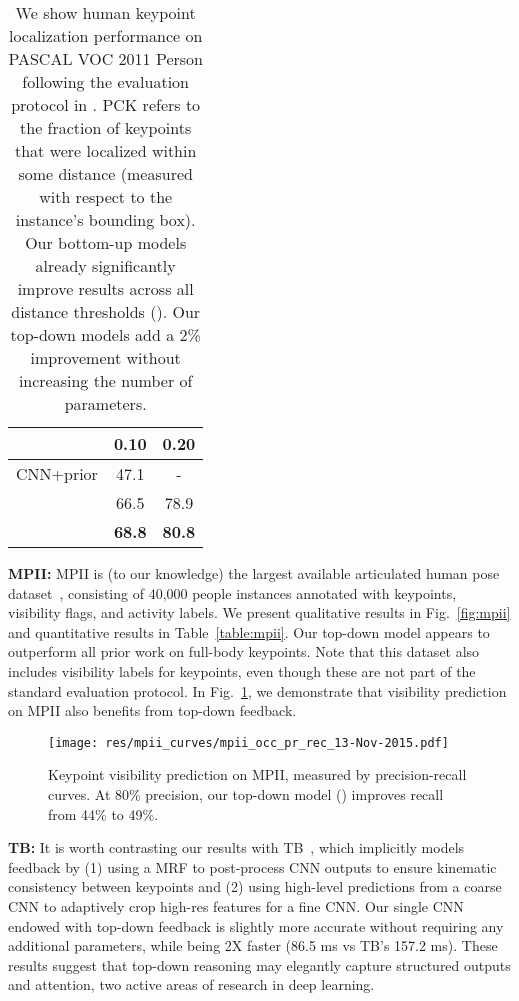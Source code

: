 \documentclass[10pt,twocolumn,letterpaper]{article}
\newcommand{\QP}[1]{{}}
\begin{document}
\begin{table}
  \centering
    \begin{tabular}{l|c|c}
                               & 0.10       & 0.20       \\
      \hline \hline
      CNN+prior\cite{long2014convnets} & 47.1       & -          \\
      \hline
      \QP{1}                           & 66.5       & 78.9       \\
      \QP{2}                           & {\bf 68.8} & {\bf 80.8} \\
    \end{tabular}
\caption{We show human keypoint localization performance on PASCAL
      VOC 2011 Person following the evaluation protocol in
      \cite{long2014convnets}. PCK refers to the fraction of keypoints
      that were localized within some distance (measured with respect
      to the instance's bounding box). Our bottom-up models already
      significantly improve results across all distance thresholds
      (). Our top-down models add a 2\% improvement
      without increasing the number of parameters. }
    \label{table:pascal}
\end{table}

{\bf MPII:} MPII is (to our knowledge) the largest available
articulated human pose dataset~\cite{andriluka14cvpr}, consisting of
40,000 people instances annotated with keypoints, visibility flags,
and activity labels. We present qualitative results in
Fig.~\ref{fig:mpii} and quantitative results in
Table~\ref{table:mpii}. Our top-down model \QP{2} appears to
outperform all prior work on full-body keypoints. Note that this dataset also includes visibility labels for keypoints, even though these are not
part of the standard evaluation protocol. In Fig.~\ref{fig:mpii-occ},
we demonstrate that visibility prediction on MPII also benefits from
top-down feedback.
\begin{figure}[t!]
  \centering
  \texttt{[image: res/mpii\_curves/mpii\_occ\_pr\_rec\_13-Nov-2015.pdf]}
  \caption{Keypoint visibility prediction on MPII, measured by
    precision-recall curves. At 80\% precision, our top-down model () improves recall from 44\% to 49\%.}
  \label{fig:mpii-occ}
\end{figure}



{\bf TB: } It is worth contrasting our results with TB~\cite{tompson2015efficient}, which implicitly models feedback by (1) using a MRF to post-process CNN outputs to ensure
kinematic consistency between keypoints and (2) using high-level
predictions from a coarse CNN to adaptively crop high-res features for a fine CNN. Our single CNN endowed with
top-down feedback is slightly more accurate without requiring any
additional parameters, while being 2X faster (86.5 ms vs TB's 157.2
ms). These results suggest that top-down reasoning may elegantly
capture structured outputs and attention, two active areas of research
in deep learning.
\end{document}
